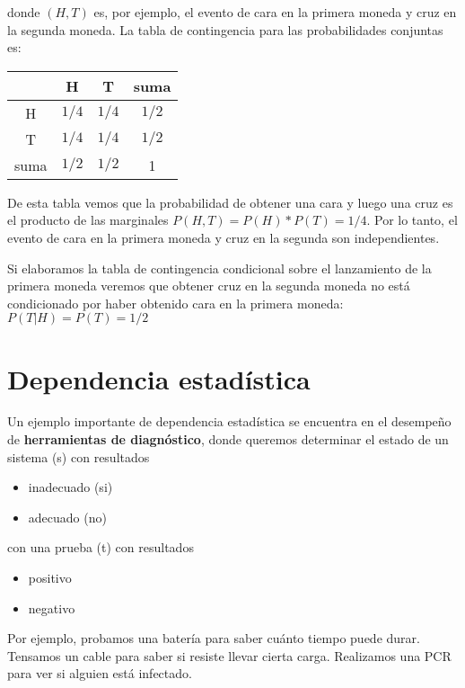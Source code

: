 \documentclass[
]{book}
\providecommand{\tightlist}{%
  \setlength{\itemsep}{0pt}\setlength{\parskip}{0pt}}
\begin{document}
donde \((H,T)\) es, por ejemplo, el evento de cara en la primera moneda y cruz en la segunda moneda. La tabla de contingencia para las probabilidades conjuntas es:

\begin{longtable}[]{@{}cccc@{}}
\toprule
& H & T & suma \\
\midrule
\endhead
H & \(1/4\) & \(1/4\) & \(1/2\) \\
T & \(1/4\) & \(1/4\) & \(1/2\) \\
suma & \(1/2\) & \(1/2\) & 1 \\
\bottomrule
\end{longtable}

De esta tabla vemos que la probabilidad de obtener una cara y luego una cruz es el producto de las marginales \(P(H, T)=P(H)*P(T)=1/4\). Por lo tanto, el evento de cara en la primera moneda y cruz en la segunda son independientes.

Si elaboramos la tabla de contingencia condicional sobre el lanzamiento de la primera moneda veremos que obtener cruz en la segunda moneda no está condicionado por haber obtenido cara en la primera moneda: \(P(T|H)=P(T) =1/2\)

\hypertarget{dependencia-estaduxedstica}{%
\section{Dependencia estadística}\label{dependencia-estaduxedstica}}

Un ejemplo importante de dependencia estadística se encuentra en el desempeño de \textbf{herramientas de diagnóstico}, donde queremos determinar el estado de un sistema (s) con resultados

\begin{itemize}
\tightlist
\item
  inadecuado (si)
\item
  adecuado (no)
\end{itemize}

con una prueba (t) con resultados

\begin{itemize}
\tightlist
\item
  positivo
\item
  negativo
\end{itemize}

Por ejemplo, probamos una batería para saber cuánto tiempo puede durar. Tensamos un cable para saber si resiste llevar cierta carga. Realizamos una PCR para ver si alguien está infectado.
\end{document}
